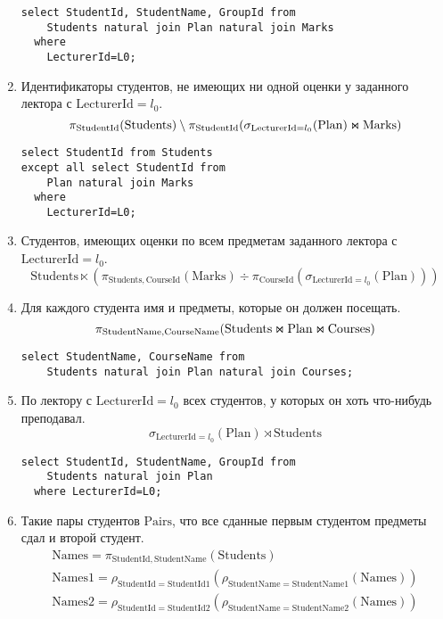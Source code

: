 \documentclass{article}
\newcommand{\Students}{\mathrm{Students}}
\newcommand{\StudentId}{\mathrm{StudentId}}
\newcommand{\StudentName}{\mathrm{StudentName}}
\newcommand{\Courses}{\mathrm{Courses}}
\newcommand{\CourseId}{\mathrm{CourseId}}
\newcommand{\CourseName}{\mathrm{CourseName}}
\newcommand{\Plan}{\mathrm{Plan}}
\newcommand{\LecturerId}{\mathrm{LecturerId}}
\newcommand{\Marks}{\mathrm{Marks}}
\newcommand{\join}{\mathbin{\mathrlap{\ltimes}{\rtimes}}}
\begin{document}
\begin{enumerate}
\[    \]
    \begin{verbatim}
select StudentId, StudentName, GroupId from
    Students natural join Plan natural join Marks
  where
    LecturerId=L0;
    \end{verbatim}
    \item Идентификаторы студентов, не имеющих ни одной оценки у заданного
        лектора с $\LecturerId=l_0$.
    \[
        \pi_{\StudentId}(\Students)\setminus
        \pi_{\StudentId}(\sigma_{\LecturerId = l_0}(\Plan) \join \Marks)
    \]
    \begin{verbatim}
select StudentId from Students
except all select StudentId from
    Plan natural join Marks
  where
    LecturerId=L0;
    \end{verbatim}
    \item Студентов, имеющих оценки по всем предметам заданного
        лектора с $\LecturerId=l_0$.
    \[
        \Students \ltimes (
        \pi_{\Students, \CourseId}(\Marks) \div
        \pi_{\CourseId}(\sigma_{\LecturerId=l_0}(\Plan)))
    \]
    \item Для каждого студента имя и предметы, которые он должен посещать.
    \[
        \pi_{\StudentName, \CourseName}(\Students \join \Plan \join \Courses)
    \]
    \begin{verbatim}
select StudentName, CourseName from
    Students natural join Plan natural join Courses;
    \end{verbatim}
    \item По лектору с $\LecturerId=l_0$ всех студентов,
        у которых он хоть что-нибудь преподавал.
    \[
        \sigma_{\LecturerId=l_0}(\Plan) \rtimes \Students
    \]
    \begin{verbatim}
select StudentId, StudentName, GroupId from
    Students natural join Plan
  where LecturerId=L0;
    \end{verbatim}
    \item Такие пары студентов $\mathrm{Pairs}$,
        что все сданные первым студентом предметы сдал и второй студент.
    \begin{gather*}
        \mathrm{Names} = \pi_{\StudentId, \StudentName}(\Students) \\
        \mathrm{Names1} =
            \rho_{\StudentId=\mathrm{StudentId1}}(
            \rho_{\StudentName=\mathrm{StudentName1}}(
            \mathrm{Names})) \\
        \mathrm{Names2} =
            \rho_{\StudentId=\mathrm{StudentId2}}(
            \rho_{\StudentName=\mathrm{StudentName2}}(
            \mathrm{Names})) \\

\end{gather*}
\end{enumerate}
\end{document}
